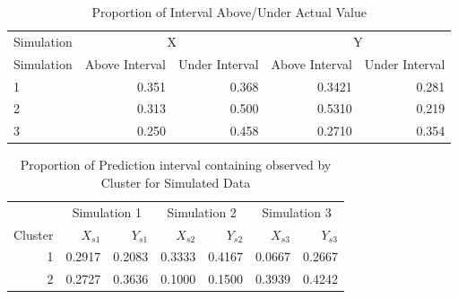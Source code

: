 \documentclass[12pt]{article}
\begin{document}
\begin{table}

\caption{\label{tab:cp-table-over-under}Proportion of Interval Above/Under Actual Value}
\centering
\begin{tabular}[t]{lrrrr}
\toprule
\multicolumn{1}{c}{Simulation} & \multicolumn{2}{c}{X} & \multicolumn{2}{c}{Y} \\
\cmidrule(l{3pt}r{3pt}){1-1} \cmidrule(l{3pt}r{3pt}){2-3} \cmidrule(l{3pt}r{3pt}){4-5}
Simulation & Above Interval & Under Interval & Above Interval & Under Interval\\
\midrule
1 & 0.351 & 0.368 & 0.3421 & 0.281\\
2 & 0.313 & 0.500 & 0.5310 & 0.219\\
3 & 0.250 & 0.458 & 0.2710 & 0.354\\
\bottomrule
\end{tabular}
\end{table}

\begin{table}

\caption{\label{tab:cp-sim-table}Proportion of Prediction interval containing observed by Cluster for Simulated Data}
\centering
\begin{tabular}[t]{rrrrrrr}
\toprule
\multicolumn{1}{c}{ } & \multicolumn{2}{c}{Simulation 1} & \multicolumn{2}{c}{Simulation 2} & \multicolumn{2}{c}{Simulation 3} \\
\cmidrule(l{3pt}r{3pt}){2-3} \cmidrule(l{3pt}r{3pt}){4-5} \cmidrule(l{3pt}r{3pt}){6-7}
Cluster & $X_{s1}$ & $Y_{s1}$ & $X_{s2}$ & $Y_{s2}$ & $X_{s3}$ & $Y_{s3}$\\
\midrule
1 & 0.2917 & 0.2083 & 0.3333 & 0.4167 & 0.0667 & 0.2667\\
2 & 0.2727 & 0.3636 & 0.1000 & 0.1500 & 0.3939 & 0.4242\\
\bottomrule
\end{tabular}
\end{table}
\end{document}
